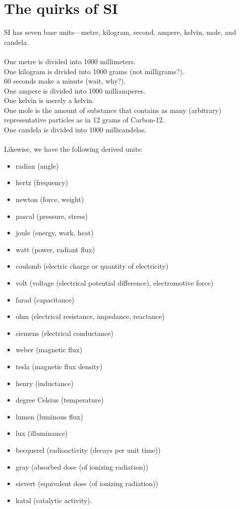 \section*{The quirks of SI}
SI has seven base units—metre, kilogram, second, ampere, kelvin, mole, and candela.
\\~\\
One metre is divided into 1000 millimeters.\\
One kilogram is divided into 1000 grams (not milligrams?).\\
60 seconds make a minute (wait, why?).\\
One ampere is divided into 1000 milliamperes.\\
One kelvin is merely a kelvin.\\
One mole is the amount of substance that contains as many (arbitrary) representative particles as in 12 grams of Carbon-12.\\
One candela is divided into 1000 millicandelas.
\\~\\
Likewise, we have the following derived units:
\begin{itemize}
    \item radian (angle)
    \item hertz (frequency)
    \item newton (force, weight)
    \item pascal (pressure, stress)
    \item joule (energy, work, heat)
    \item watt (power, radiant flux)
    \item coulomb (electric charge or quantity of electricity)
    \item volt (voltage  (electrical potential difference), electromotive force)
    \item farad (capacitance)
    \item ohm (electrical resistance, impedance, reactance)
    \item siemens (electrical conductance)
    \item weber (magnetic flux)
    \item tesla (magnetic flux density)
    \item henry (inductance)
    \item degree Celsius    (temperature)
    \item lumen (luminous flux)
    \item lux (illuminance)
    \item becquerel (radioactivity  (decays per unit time))
    \item gray (absorbed dose  (of ionizing radiation))
    \item sievert (equivalent dose  (of ionizing radiation))
    \item katal (catalytic activity).
\end{itemize}

